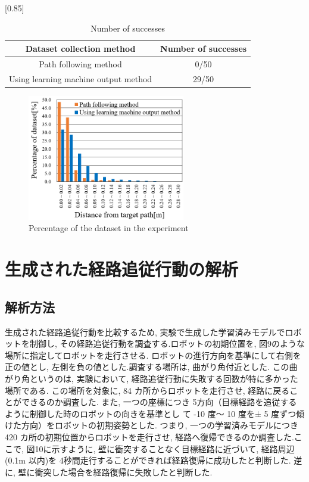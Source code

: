 \documentclass{jarticle}
\begin{document}
\begin{table}[htbp]
  \centering
  \caption{Number of successes} \vspace*{2mm}
    \scalebox{0.85}[0.85] {
    \begin{tabular}{|c|c|}
      \hline\hline
      Dataset collection method & Number of successes \\
      \hline\hline
      Path following method & 0/50 \\
      Using learning machine output method & 29/50 \\
      \hline
    \end{tabular} }
\end {table}


\begin{figure}[htbp]
  \centering
   \includegraphics[height=55mm]{./figs/tes.png}
   \caption{Percentage of the dataset in the experiment}
\end{figure}


\section{生成された経路追従行動の解析}
\subsection{解析方法}
生成された経路追従行動を比較するため, 実験で生成した学習済みモデルでロボットを制御し, 
その経路追従行動を調査する.ロボットの初期位置を,  図9のような場所に指定してロボットを走行させる.
ロボットの進行方向を基準にして右側を正の値とし, 左側を負の値とした.調査する場所は, 曲がり角付近とした. 
この曲がり角というのは, 実験において, 経路追従行動に失敗する回数が特に多かった場所である.
この場所を対象に,  84 カ所からロボットを走行させ, 経路に戻ることができるのか調査した.
また, 一つの座標につき 5方向（目標経路を追従するように制御した時のロボットの向きを基準とし
て -10 度〜 10 度を± 5 度ずつ傾けた方向）をロボットの初期姿勢とした. 
つまり,  一つの学習済みモデルにつき 420 カ所の初期位置からロボットを走行させ, 
経路へ復帰できるのか調査した.ここで, 図10に示すように, 壁に衝突することなく目標経路に近づいて, 
経路周辺 (0.1m 以内)を 4秒間走行することができれば経路復帰に成功したと判断した.
逆に, 壁に衝突した場合を経路復帰に失敗したと判断した.
\end{document}
